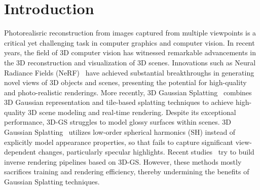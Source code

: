 \section{Introduction}
\label{sec:intro}

Photorealisric reconstruction from images captured from multiple viewpoints is a critical yet challenging task in computer graphics and computer vision. In recent years, the field of 3D computer vision has witnessed remarkable advancements in the 3D reconstruction and visualization of 3D scenes. Innovations such as Neural Radiance Fields (NeRF)~\cite{mildenhall2020nerf} have achieved substantial breakthroughs in generating novel views of 3D objects and scenes, presenting the potential for high-quality and photo-realistic renderings. More recently, 3D Gaussian Splatting~\cite{kerbl20233d} combines 3D Gaussian representation and tile-based splatting techniques to achieve high-quality 3D scene modeling and real-time rendering. Despite its exceptional performance, 3D-GS struggles to model glossy surfaces within scenes. 3D Gaussian Splatting~\cite{kerbl20233d} utilizes low-order spherical harmonics (SH) instead of explicitly model appearance properties, so that fails to capture significant view-dependent changes, particularly specular highlights. Recent studies~\cite{liang2024gs,gao2023relightable,jiang2024gaussianshader} try to build inverse rendering pipelines based on 3D-GS. However, these methods mostly sacrifices training and rendering efficiency, thereby undermining the benefits of Gaussian Splatting techniques. 




